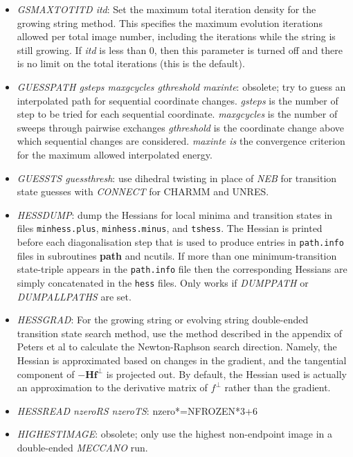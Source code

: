 \documentclass[12pt,a4paper,dvips]{article}
\begin{document}
\begin{itemize}
\item {\it GSMAXTOTITD itd\/}: Set the maximum total iteration density for the
  growing string method. This specifies the maximum evolution iterations allowed per
  total image number, including the iterations while the string is still
  growing. If {\it itd\/} is less than 0, then this parameter is turned off
  and there is no limit on the total iterations (this is the default).

\item {\it GUESSPATH gsteps maxgcycles gthreshold maxinte\/}:
obsolete;
try to guess an interpolated path for sequential coordinate changes.
{\it gsteps\/} is the number of step to be tried for each sequential coordinate.
{\it maxgcycles\/} is the number of sweeps through pairwise exchanges
{\it gthreshold\/} is the coordinate change above which sequential changes are considered.
{\it maxinte is\/} the convergence criterion for the maximum allowed interpolated energy.

\item {\it GUESSTS guessthresh\/}: use dihedral twisting in place of {\it NEB\/} for 
transition state guesses with {\it CONNECT\/} for CHARMM and UNRES.

\item {\it HESSDUMP\/}: dump the Hessians for local minima and transition states
in files {\tt minhess.plus}, {\tt minhess.minus}, and {\tt tshess}.
The Hessian is printed before each diagonalisation step that is used to produce
entries in {\tt path.info} files in subroutines {\bf path} and {ncutils}.
If more than one minimum-transition state-triple appears in the {\tt path.info}
file then the corresponding Hessians are simply concatenated in the {\tt hess}
files. Only works if {\it DUMPPATH} or {\it DUMPALLPATHS} are set.

\item {\it HESSGRAD\/}: For the growing string or evolving string double-ended
  transition state search method, use the method described in the appendix of
  Peters et al\cite{PetersHBC04} to calculate the Newton-Raphson search
  direction. Namely, the Hessian is approximated based on changes in the
  gradient, and the tangential component of $-\mathbf{Hf^\perp}$ is projected
  out. By default, the Hessian used is actually an approximation to the
  derivative matrix of $f^\perp$ rather than the gradient.

\item {\it HESSREAD nzeroRS nzeroTS\/}: nzero*=NFROZEN*3+6
  
\item {\it HIGHESTIMAGE\/}: obsolete; 
only use the highest non-endpoint image in a double-ended {\it MECCANO\/} run.


\end{itemize}
\end{document}
